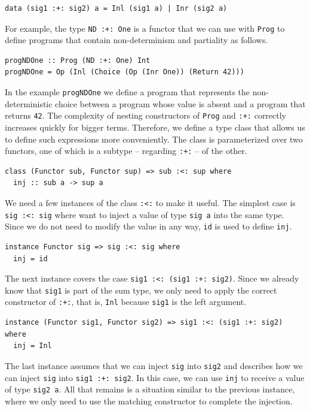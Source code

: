 \documentclass[a4paper, 11pt, fleqn, twoside]{scrreprt}
\newcommand{\hinl}[1]{\texttt{#1}}
\begin{document}
\begin{verbatim}
data (sig1 :+: sig2) a = Inl (sig1 a) | Inr (sig2 a)
\end{verbatim}

For example, the type \hinl{ND :+: One} is a functor that we can use with \hinl{Prog} to define programs that contain non-determinism and partiality as follows.

\begin{verbatim}
progNDOne :: Prog (ND :+: One) Int
progNDOne = Op (Inl (Choice (Op (Inr One)) (Return 42)))
\end{verbatim}

In the example \hinl{progNDOne} we define a program that represents the non-deterministic choice between a program whose value is absent and a program that returns \hinl{42}.
The complexity of nesting constructors of \hinl{Prog} and \hinl{:+:} correctly increases quickly for bigger terms.
Therefore, we define a type class that allows us to define such expressions more conveniently.
The class is parameterized over two functors, one of which is a subtype -- regarding \hinl{:+:} -- of the other.

\begin{verbatim}
class (Functor sub, Functor sup) => sub :<: sup where
  inj :: sub a -> sup a
\end{verbatim}

We need a few instances of the class \hinl{:<:} to make it useful.
The simplest case is \hinl{sig :<: sig} where want to inject a value of type \hinl{sig a} into the same type.
Since we do not need to modify the value in any way, \hinl{id} is used to define \hinl{inj}.

\begin{verbatim}
instance Functor sig => sig :<: sig where
  inj = id  
\end{verbatim}

The next instance covers the case \hinl{sig1 :<: (sig1 :+: sig2)}.
Since we already know that \hinl{sig1} is part of the sum type, we only need to apply the correct constructor of \hinl{:+:}, that is, \hinl{Inl} because \hinl{sig1} is the left argument.

\begin{verbatim}
instance (Functor sig1, Functor sig2) => sig1 :<: (sig1 :+: sig2) where
  inj = Inl
\end{verbatim}

The last instance assumes that we can inject \hinl{sig} into \hinl{sig2} and describes how we can inject \hinl{sig} into \hinl{sig1 :+: sig2}.
In this case, we can use \hinl{inj} to receive a value of type \hinl{sig2 a}.
All that remains is a situation similar to the previous instance, where we only need to use the matching constructor to complete the injection.
 
\end{document}
